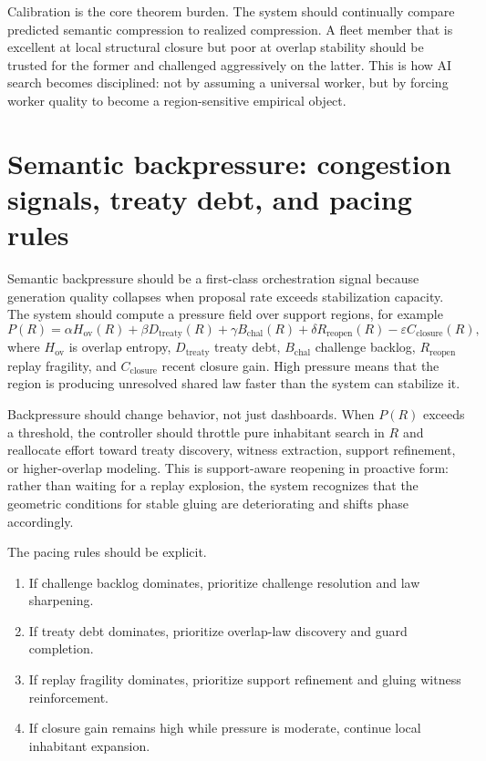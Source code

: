 \documentclass[11pt]{report}
\begin{document}
Calibration is the core theorem burden. The system should continually compare predicted semantic compression to realized compression. A fleet member that is excellent at local structural closure but poor at overlap stability should be trusted for the former and challenged aggressively on the latter. This is how AI search becomes disciplined: not by assuming a universal worker, but by forcing worker quality to become a region-sensitive empirical object.

\section{Semantic backpressure: congestion signals, treaty debt, and pacing rules}
Semantic backpressure should be a first-class orchestration signal because generation quality collapses when proposal rate exceeds stabilization capacity. The system should compute a pressure field over support regions, for example
\[
P(R)
=
\alpha H_{\mathrm{ov}}(R)
+
\beta D_{\mathrm{treaty}}(R)
+
\gamma B_{\mathrm{chal}}(R)
+
\delta R_{\mathrm{reopen}}(R)
-
\varepsilon C_{\mathrm{closure}}(R),
\]
where $H_{\mathrm{ov}}$ is overlap entropy, $D_{\mathrm{treaty}}$ treaty debt, $B_{\mathrm{chal}}$ challenge backlog, $R_{\mathrm{reopen}}$ replay fragility, and $C_{\mathrm{closure}}$ recent closure gain. High pressure means that the region is producing unresolved shared law faster than the system can stabilize it.

Backpressure should change behavior, not just dashboards. When $P(R)$ exceeds a threshold, the controller should throttle pure inhabitant search in $R$ and reallocate effort toward treaty discovery, witness extraction, support refinement, or higher-overlap modeling. This is support-aware reopening in proactive form: rather than waiting for a replay explosion, the system recognizes that the geometric conditions for stable gluing are deteriorating and shifts phase accordingly.

The pacing rules should be explicit.
\begin{enumerate}
\item If challenge backlog dominates, prioritize challenge resolution and law sharpening.
\item If treaty debt dominates, prioritize overlap-law discovery and guard completion.
\item If replay fragility dominates, prioritize support refinement and gluing witness reinforcement.
\item If closure gain remains high while pressure is moderate, continue local inhabitant expansion.
\end{enumerate}
\end{document}
